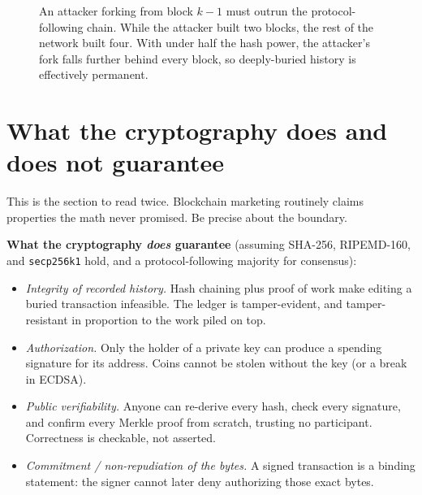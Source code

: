 \begin{figure}[H]
\centering
{}
\caption{An attacker forking from block $k{-}1$ must outrun the protocol-following chain. While the attacker built two blocks, the rest of the network built four. With under half the hash power, the attacker's fork falls further behind every block, so deeply-buried history is effectively permanent.}
\label{ch36:fig-fork}
\end{figure}

\section{What the cryptography does and does not guarantee}
\label{ch36:guarantees}

This is the section to read twice. Blockchain marketing routinely claims properties the math never promised. Be precise about the boundary.

\textbf{What the cryptography \emph{does} guarantee} (assuming SHA-256, RIPEMD-160, and \texttt{secp256k1} hold, and a protocol-following majority for consensus):

\begin{itemize}
  \item \emph{Integrity of recorded history.} Hash chaining plus proof of work make editing a buried transaction infeasible. The ledger is tamper-evident, and tamper-resistant in proportion to the work piled on top.
  \item \emph{Authorization.} Only the holder of a private key can produce a spending signature for its address. Coins cannot be stolen without the key (or a break in ECDSA).
  \item \emph{Public verifiability.} Anyone can re-derive every hash, check every signature, and confirm every Merkle proof from scratch, trusting no participant. Correctness is checkable, not asserted.
  \item \emph{Commitment / non-repudiation of the bytes.} A signed transaction is a binding statement: the signer cannot later deny authorizing those exact bytes.
\end{itemize}

